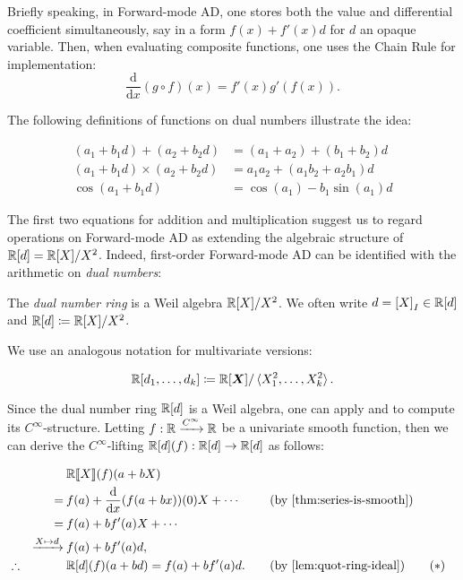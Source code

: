 \documentclass[runningheads]{llncs}
\begin{document}
Briefly speaking, in Forward-mode AD, one stores both the value and differential coefficient simultaneously, say in a form $f(x) + f'(x) d$ for $d$ an opaque variable.
Then, when evaluating composite functions, one uses the Chain Rule for implementation:
\[
  \frac{\mathrm{d}}{\mathrm{d}x}(g \circ f)(x) = f'(x) g'(f(x)).
\]

The following definitions of functions on dual numbers illustrate the idea:

\begin{align*}
  (a_1 + b_1 d) + (a_2 + b_2 d) &= (a_1 + a_2) + (b_1 + b_2)d\\
  (a_1 + b_1 d) \times (a_2 + b_2 d) &= a_1 a_2 + (a_1 b_2 + a_2 b_1)d\\
  \cos(a_1 + b_1 d) &= \cos(a_1) - b_1 \sin(a_1) d
\end{align*}

The first two equations for addition and multiplication suggest us to regard operations on Forward-mode AD as extending the algebraic structure of $\mathbb{R}[d] = \mathbb{R}[X]/X^2$.
Indeed, first-order Forward-mode AD can be identified with the arithmetic on \emph{dual numbers}:
\begin{definition}
  The \emph{dual number ring} is a Weil algebra $\mathbb{R}[X]/{X^2}$.
  We often write $d = {[X]}_I \in \mathbb{R}[d]$ and $\mathbb{R}[d] \coloneq \mathbb{R}[X]/{X^2}$.

  We use an analogous notation for multivariate versions:
  
  \[
    \mathbb{R}[d_1, \dots, d_k] \coloneq \mathbb{R}[\boldsymbol{X}]/\braket{X_1^2, \dots, X_k^2}.
  \]
\end{definition}

Since the dual number ring $\mathbb{R}[d]$ is a Weil algebra, one can apply  and  to compute its $C^\infty$-structure.
Letting $f: \mathbb{R} \xrightarrow{C^\infty} \mathbb{R}$ be a univariate smooth function, then we can derive the $C^\infty$-lifting $\mathbb{R}[d](f): \mathbb{R}[d] \to \mathbb{R}[d]$ as follows:

\begin{alignat*}{3}
  &&&\R\llbracket{}X\rrbracket(f)(a + bX) \\
  &&=\:&f(a) + \frac{\mathrm d}{\mathrm{d} x}(f(a + bx))(0) X + \cdots
  &\quad&(\text{by \Cref{thm:series-is-smooth}})\\
  &&=\:&f(a) + b f'(a) X + \cdots\\
  &&\xrightarrow{X \mapsto d}\:&f(a) + bf'(a) d,\\
  &\therefore&& \R[d](f)(a + bd) = f(a) + b f'(a) d.
  && (\text{by \Cref{lem:quot-ring-ideal}}) \tag{\ensuremath{\ast}}
  \label{eqn:dual-smooth}
\end{alignat*}
\end{document}

